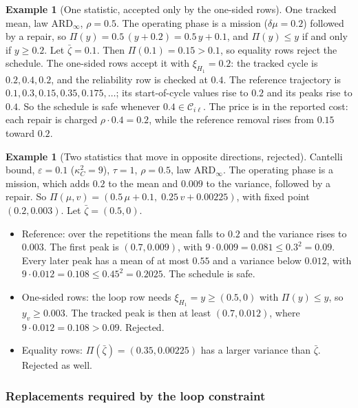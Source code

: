 \documentclass[11pt,a4paper]{article}
\theoremstyle{plain}
\theoremstyle{definition}
\newtheorem{example}[theorem]{Example}
\theoremstyle{remark}
\begin{document}
\begin{example}[One statistic, accepted only by the one-sided rows]
One tracked mean, law $\text{ARD}_\infty$, $\rho = 0.5$.
The operating phase is a mission ($\delta\mu = 0.2$) followed by a repair, so $\Pi(y) = 0.5\,(y + 0.2) = 0.5\,y + 0.1$, and $\Pi(y) \le y$ if and only if $y \ge 0.2$.
Let $\bar\zeta = 0.1$.
Then $\Pi(0.1) = 0.15 > 0.1$, so equality rows reject the schedule.
The one-sided rows accept it with $\xi_{H_1} = 0.2$: the tracked cycle is $0.2, 0.4, 0.2$, and the reliability row is checked at $0.4$.
The reference trajectory is $0.1, 0.3, 0.15, 0.35, 0.175, \ldots$; its start-of-cycle values rise to $0.2$ and its peaks rise to $0.4$.
So the schedule is safe whenever $0.4 \in \mathcal{C}_{i\ell}$.
The price is in the reported cost: each repair is charged $\rho \cdot 0.4 = 0.2$, while the reference removal rises from $0.15$ toward $0.2$.
\end{example}

\begin{example}[Two statistics that move in opposite directions, rejected]
Cantelli bound, $\varepsilon = 0.1$ ($\kappa_C^2 = 9$), $\tau = 1$, $\rho = 0.5$, law $\text{ARD}_\infty$.
The operating phase is a mission, which adds $0.2$ to the mean and $0.009$ to the variance, followed by a repair.
So $\Pi(\mu, v) = (0.5\,\mu + 0.1,\; 0.25\,v + 0.00225)$, with fixed point $(0.2, 0.003)$.
Let $\bar\zeta = (0.5, 0)$.
\begin{itemize}[nosep]
  \item Reference: over the repetitions the mean falls to $0.2$ and the variance rises to $0.003$.
    The first peak is $(0.7, 0.009)$, with $9 \cdot 0.009 = 0.081 \le 0.3^2 = 0.09$.
    Every later peak has a mean of at most $0.55$ and a variance below $0.012$, with $9 \cdot 0.012 = 0.108 \le 0.45^2 = 0.2025$.
    The schedule is safe.
  \item One-sided rows: the loop row needs $\xi_{H_1} = y \ge (0.5, 0)$ with $\Pi(y) \le y$, so $y_v \ge 0.003$.
    The tracked peak is then at least $(0.7, 0.012)$, where $9 \cdot 0.012 = 0.108 > 0.09$.
    Rejected.
  \item Equality rows: $\Pi(\bar\zeta) = (0.35, 0.00225)$ has a larger variance than $\bar\zeta$.
    Rejected as well.
\end{itemize}
\end{example}

\subsubsection{Replacements required by the loop constraint}
\label{sec:loop_replacements}
\end{document}
